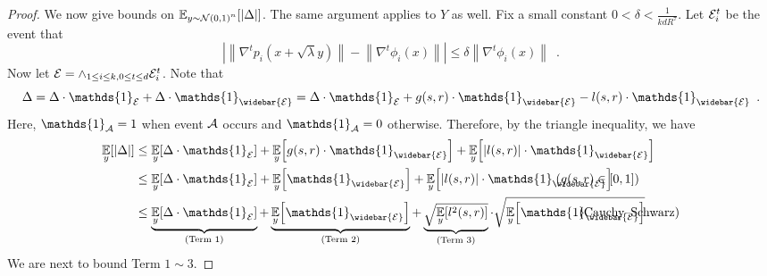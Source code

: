 \documentclass[12pt]{article}
\newcommand{\grad}[2]{\nabla^{#1}{#2}}
\newcommand{\br}[1]{\left(#1\right)} \newcommand{\Br}[1]{\left[#1\right]} \newcommand{\st}[1]{\left\{#1\right\}} \newcommand{\tr}[1]{\mathrm{Tr}\!\Br{#1}} \newcommand{\abs}[1]{\left|#1 \right|} \newcommand{\norm}[1]{\left\lVert #1 \right\rVert} \newcommand{\agl}[2]{\theta^{\br{#1}}_{#2}} \newcommand{\aglp}[2]{{\theta'}^{\br{#1}}_{#2}} \newcommand{\lint}[1]{\left\lfloor#1\right\rfloor} \newcommand{\poly}[1]{\mathrm{poly}\!\br{#1}} \newcommand{\negl}[1]{\mathrm{negl}\!\br{#1}} \newcommand{\de}[1]{\mathrm{d}#1} \newcommand{\val}[1]{\mathrm{val}\!\br{#1}} \newcommand{\vall}[1]{\mathrm{val}\br{#1}} \newcommand{\nd}[1]{\mathcal{N}\!\br{#1}} \newcommand{\ketbratwo}[2]{\ket{#1} \hspace{-0.4em}\bra{#2}} \newcommand{\ketbra}[1]{\ketbratwo{#1}{#1}} \newcommand{\id}{\ensuremath{\mathds{1}}} \newcommand{\ogroup}[1]{\mathrm{O}\!\br{#1}} \newcommand{\ugroup}[1]{\mathrm{U}\!\br{#1}} \newcommand{\td}{\mathrm{TD}} \newcommand{\tv}[1]{\norm{#1}_{\mathrm{TV}}} \newcommand {\defeq} {\ensuremath{ \stackrel{\mathrm{def}}{=} }} \newcommand{\vdim}{\ensuremath{N}} \newcommand{\dimin}{\ensuremath{n}} \newcommand{\dimout}{\ensuremath{m}} \newcommand{\ncopy}{\ell} \newcommand{\hspacein}{\H_\mathrm{in}} \newcommand{\hspaceout}{\H_\mathrm{out}} \newcommand{\Sin}{\S(\hspacein)} \newcommand{\Sout}{\S(\hspaceout)} \newcommand{\haar}{\ensuremath{\mu}} \newcommand{\tensorhaar}{\ensuremath{\eta}} \newcommand{\tensorsrss}{\ensuremath{\nu}} \newcommand{\qadvice}{\ensuremath{\rho}} \newcommand{\tp}{\otimes} \newcommand{\wone}[2]{W_1\!\br{#1,#2}}
\begin{document}
\begin{proof}
	We now give bounds on $\expect{y\sim\NN\br{0,1}^n}{\abs{\Delta}}$.
	The same argument applies to $Y$ as well.
	Fix a small constant $0<\delta < \frac{1}{kdR^7} $. Let $\mathcal{E}_i^t$ be the event that
	\[
		\abs{ \norm{\grad{t}{p_i(x+\sqrt{\lambda}y)}} -  \norm{\grad{t}{\phi_i(x)}}} \leq \delta \norm{\grad{t}{\phi_i(x)}} \enspace.
	\]
	Now let $\mathcal{E} = \wedge_{1\leq i\leq k, 0\leq t\leq d} \mathcal{E}_{i}^t$.
	Note that
	\[ \Delta = \Delta \cdot \id_\EE + \Delta \cdot \id_{\widebar{\EE}} = \Delta \cdot \id_\EE + g(s,r)\cdot \id_{\widebar{\EE}} - l(s,r)\cdot \id_{\widebar{\EE}} \enspace . \]
	Here, $\id_\A = 1$ when event $\mathcal{A}$ occurs and $\id_\A = 0$ otherwise.
	Therefore, by the triangle inequality, we have
	\begin{align*}
		\expect{y}{\abs{\Delta}}&\leq
		\expect{y}{\Delta \cdot \id_\EE} + 
		\expect{y}{g(s,r)\cdot \id_{\widebar{\EE}}} + 
		\expect{y}{\abs{l(s,r)}\cdot \id_{\widebar{\EE}}} \nonumber\\ 
		&\leq
		\expect{y}{\Delta \cdot \id_\EE} + 
		\expect{y}{\id_{\widebar{\EE}}} + 
		\expect{y}{\abs{l(s,r)}\cdot \id_{\widebar{\EE}}} \tag*{\llap{($g(s,r)\in [0,1]$)}}\nonumber\\
		&\leq
		\underbrace{\expect{y}{\Delta \cdot \id_\EE}}_{(\text{Term }1)} +
		\underbrace{\expect{y}{\id_{\widebar{\EE}}}}_{(\text{Term }2)} +
		\underbrace{\sqrt{\expect{y}{l^2(s,r)}}}_{(\text{Term }3)}\cdot
		\sqrt{ \expect{y}{\id_{\widebar{\EE}}}} \enspace . \tag*{\llap{(Cauchy–Schwarz)}}
	\end{align*}
	We are next to bound Term $1\sim 3$.
	

\end{proof}
\end{document}
